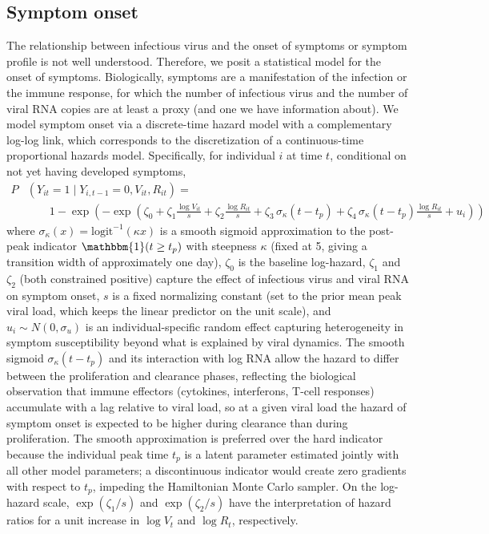 \documentclass[12pt]{article}
\begin{document}
\subsection{Symptom onset} \label{sec:symptom_onset}
The relationship between infectious virus and the onset of symptoms or symptom profile is not well understood. Therefore, we posit a statistical model for the onset of symptoms. Biologically, symptoms are a manifestation of the infection or the immune response, for which the number of infectious virus and the number of viral RNA copies are at least a proxy (and one we have information about). We model symptom onset via a discrete-time hazard model with a complementary log-log link, which corresponds to the discretization of a continuous-time proportional hazards model. Specifically, for individual $i$ at time $t$, conditional on not yet having developed symptoms,
\begin{align*}
    P&(Y_{it} = 1 \mid Y_{i,t-1} = 0, V_{it}, R_{it}) = \\
    &\qquad 1 - \exp\!\left(-\exp\!\left(\zeta_0 + \zeta_1 \frac{\log V_{it}}{s} + \zeta_2 \frac{\log R_{it}}{s} + \zeta_3 \,\sigma_\kappa(t - t_p) + \zeta_4 \,\sigma_\kappa(t - t_p) \frac{\log R_{it}}{s} + u_i\right)\right)
\end{align*}
where $\sigma_\kappa(x) = \text{logit}^{-1}(\kappa x)$ is a smooth sigmoid approximation to the post-peak indicator $\mathbbm{1}(t \geq t_p)$ with steepness $\kappa$ (fixed at 5, giving a transition width of approximately one day), $\zeta_0$ is the baseline log-hazard, $\zeta_1$ and $\zeta_2$ (both constrained positive) capture the effect of infectious virus and viral RNA on symptom onset, $s$ is a fixed normalizing constant (set to the prior mean peak viral load, which keeps the linear predictor on the unit scale), and $u_i \sim N(0, \sigma_u)$ is an individual-specific random effect capturing heterogeneity in symptom susceptibility beyond what is explained by viral dynamics. The smooth sigmoid $\sigma_\kappa(t - t_p)$ and its interaction with log RNA allow the hazard to differ between the proliferation and clearance phases, reflecting the biological observation that immune effectors (cytokines, interferons, T-cell responses) accumulate with a lag relative to viral load, so at a given viral load the hazard of symptom onset is expected to be higher during clearance than during proliferation. The smooth approximation is preferred over the hard indicator because the individual peak time $t_p$ is a latent parameter estimated jointly with all other model parameters; a discontinuous indicator would create zero gradients with respect to $t_p$, impeding the Hamiltonian Monte Carlo sampler. On the log-hazard scale, $\exp(\zeta_1/s)$ and $\exp(\zeta_2/s)$ have the interpretation of hazard ratios for a unit increase in $\log V_t$ and $\log R_t$, respectively.
\end{document}
